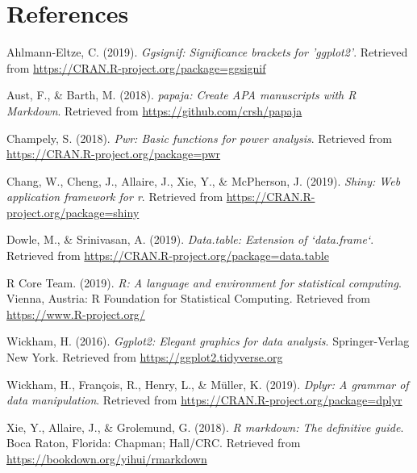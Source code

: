\documentclass[man,floatsintext]{apa6}
\begin{document}
\section{References}\label{references}

\begingroup
\setlength{\parindent}{-0.5in} \setlength{\leftskip}{0.5in}

\hypertarget{refs}{}
\hypertarget{ref-R-ggsignif}{}
Ahlmann-Eltze, C. (2019). \emph{Ggsignif: Significance brackets for
'ggplot2'}. Retrieved from
\url{https://CRAN.R-project.org/package=ggsignif}

\hypertarget{ref-R-papaja}{}
Aust, F., \& Barth, M. (2018). \emph{papaja: Create APA manuscripts with
R Markdown}. Retrieved from \url{https://github.com/crsh/papaja}

\hypertarget{ref-R-pwr}{}
Champely, S. (2018). \emph{Pwr: Basic functions for power analysis}.
Retrieved from \url{https://CRAN.R-project.org/package=pwr}

\hypertarget{ref-R-shiny}{}
Chang, W., Cheng, J., Allaire, J., Xie, Y., \& McPherson, J. (2019).
\emph{Shiny: Web application framework for r}. Retrieved from
\url{https://CRAN.R-project.org/package=shiny}

\hypertarget{ref-R-data.table}{}
Dowle, M., \& Srinivasan, A. (2019). \emph{Data.table: Extension of
`data.frame`}. Retrieved from
\url{https://CRAN.R-project.org/package=data.table}

\hypertarget{ref-R-base}{}
R Core Team. (2019). \emph{R: A language and environment for statistical
computing}. Vienna, Austria: R Foundation for Statistical Computing.
Retrieved from \url{https://www.R-project.org/}

\hypertarget{ref-R-ggplot2}{}
Wickham, H. (2016). \emph{Ggplot2: Elegant graphics for data analysis}.
Springer-Verlag New York. Retrieved from
\url{https://ggplot2.tidyverse.org}

\hypertarget{ref-R-dplyr}{}
Wickham, H., François, R., Henry, L., \& Müller, K. (2019). \emph{Dplyr:
A grammar of data manipulation}. Retrieved from
\url{https://CRAN.R-project.org/package=dplyr}

\hypertarget{ref-R-rmarkdown}{}
Xie, Y., Allaire, J., \& Grolemund, G. (2018). \emph{R markdown: The
definitive guide}. Boca Raton, Florida: Chapman; Hall/CRC. Retrieved
from \url{https://bookdown.org/yihui/rmarkdown}

\endgroup
\end{document}
